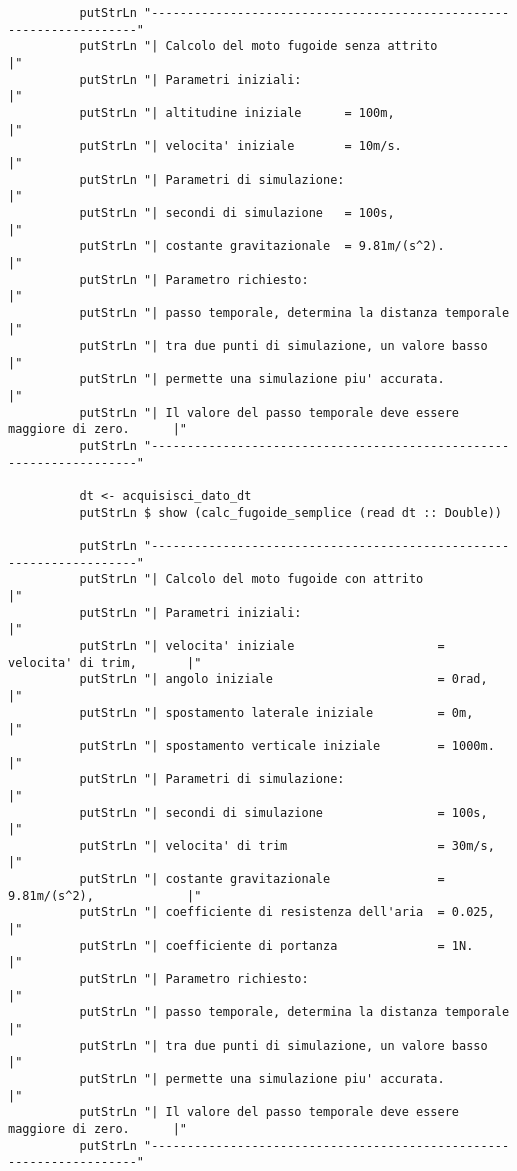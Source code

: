 \begin{verbatim}
          putStrLn "--------------------------------------------------------------------"
          putStrLn "| Calcolo del moto fugoide senza attrito                           |"
          putStrLn "| Parametri iniziali:                                              |"
          putStrLn "| altitudine iniziale      = 100m,                                 |"
          putStrLn "| velocita' iniziale       = 10m/s.                                |"
          putStrLn "| Parametri di simulazione:                                        |"
          putStrLn "| secondi di simulazione   = 100s,                                 |"
          putStrLn "| costante gravitazionale  = 9.81m/(s^2).                          |"
          putStrLn "| Parametro richiesto:                                             |"
          putStrLn "| passo temporale, determina la distanza temporale                 |"
          putStrLn "| tra due punti di simulazione, un valore basso                    |"
          putStrLn "| permette una simulazione piu' accurata.                          |"
          putStrLn "| Il valore del passo temporale deve essere maggiore di zero.      |"
          putStrLn "--------------------------------------------------------------------"

          dt <- acquisisci_dato_dt
          putStrLn $ show (calc_fugoide_semplice (read dt :: Double))

          putStrLn "--------------------------------------------------------------------"
          putStrLn "| Calcolo del moto fugoide con attrito                             |"
          putStrLn "| Parametri iniziali:                                              |"
          putStrLn "| velocita' iniziale                    = velocita' di trim,       |"
          putStrLn "| angolo iniziale                       = 0rad,                    |"
          putStrLn "| spostamento laterale iniziale         = 0m,                      |"
          putStrLn "| spostamento verticale iniziale        = 1000m.                   |"
          putStrLn "| Parametri di simulazione:                                        |"
          putStrLn "| secondi di simulazione                = 100s,                    |"
          putStrLn "| velocita' di trim                     = 30m/s,                   |"
          putStrLn "| costante gravitazionale               = 9.81m/(s^2),             |"
          putStrLn "| coefficiente di resistenza dell'aria  = 0.025,                   |"
          putStrLn "| coefficiente di portanza              = 1N.                      |"
          putStrLn "| Parametro richiesto:                                             |"
          putStrLn "| passo temporale, determina la distanza temporale                 |"
          putStrLn "| tra due punti di simulazione, un valore basso                    |"
          putStrLn "| permette una simulazione piu' accurata.                          |"
          putStrLn "| Il valore del passo temporale deve essere maggiore di zero.      |"
          putStrLn "--------------------------------------------------------------------"


\end{verbatim}
